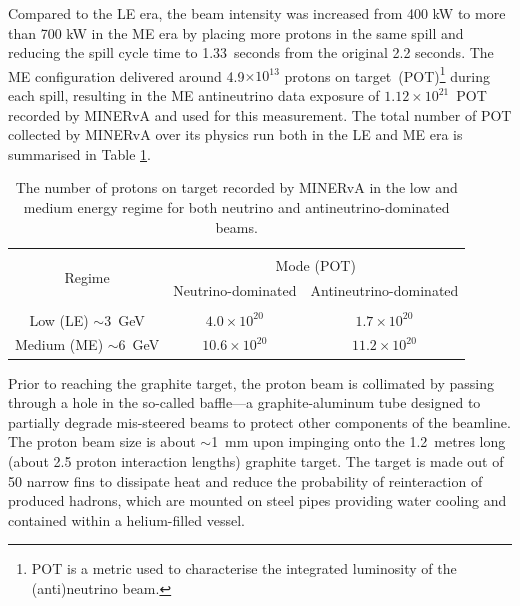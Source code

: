Compared to the LE era, the beam intensity was increased from 400 kW to more than 700 kW in the ME era by placing more protons in the same spill and reducing the spill cycle time to 1.33~seconds from the original 2.2 seconds. The ME configuration delivered around 4.9$\times 10^{13}$ protons on target~(POT)\footnote{POT is a metric used to characterise the integrated luminosity of the (anti)neutrino beam.} during each spill, resulting in the ME antineutrino data exposure of $1.12 \times 10^{21}$~POT recorded by MINERvA and used for this measurement.  The total number of POT collected by MINERvA over its physics run both in the LE and ME era is summarised in Table \ref{table:pot}.

\begin{table}[t!]
    \vspace{-10pt}
    \centering
    \begin{tabular}{c c c}
    \hline \\ [-1.5 ex]
    \multirow[c]{2}{*}{Regime}& \multicolumn{2}{c}{Mode (POT)} \\
    & Neutrino-dominated & Antineutrino-dominated\\ [0.5ex] %
    \hline
    \hline \\[-1.8ex]
    Low (LE) $\sim$3~GeV & $4.0\times 10^{20}$ & $1.7 \times 10^{20}$ \\ 
    Medium (ME) $\sim$6~GeV & $10.6 \times 10^{20}$ & $11.2 \times 10^{20}$ \\
    \hline
    \end{tabular}

    \caption{The number of protons on target recorded by MINERvA in the low and medium energy regime for both neutrino and antineutrino-dominated beams.}
    \label{table:pot}
\end{table}



Prior to reaching the graphite target, the proton beam is collimated by passing through a hole in the so-called baffle---a graphite-aluminum tube designed to partially degrade mis-steered beams to protect other components of the beamline. The proton beam size is about $\sim$1~mm upon impinging onto the 1.2~metres long (about 2.5 proton interaction lengths) graphite target. The target is made out of 50 narrow fins to dissipate heat and reduce the probability of reinteraction of produced hadrons, which are mounted on steel pipes providing water cooling and contained within a helium-filled vessel.

